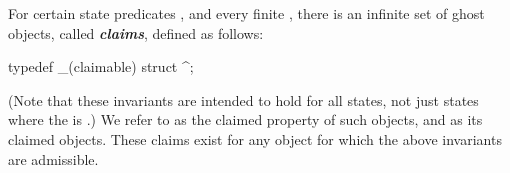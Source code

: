 \documentclass[preprint,nocopyrightspace]{sigplanconf}
\newcommand{\Def}[1]{\textit{\textbf{#1}}}
\begin{document}
{{{{For certain state predicates , and every finite , 
there is an infinite set of ghost
objects, called \Def{claims}, defined as follows:
\begin{VCC}
  typedef _(claimable) struct  ^\claim;
\end{VCC}
(Note that these invariants are intended to hold for all states, not
just states where the \vcc{\claim} is \vcc{\closed}.)
We refer to  as the claimed property of such objects,
and  as its claimed objects. 
These claims exist for any object for which the above invariants
are admissible.

}}}}
\end{document}

